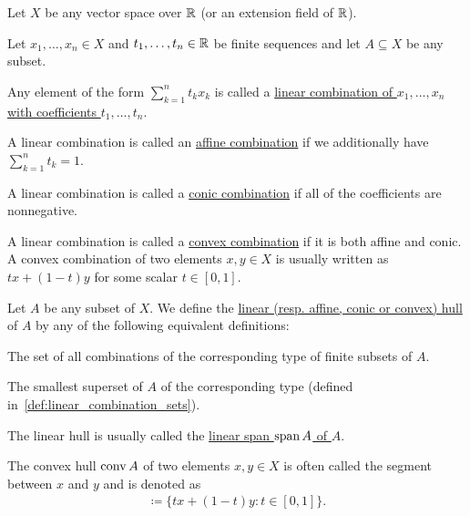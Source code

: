 Let $X$ be any vector space over $\mathbb R$ (or an extension field of $\mathbb R$).

\begin{definition}\label{def:linear_combinations}
  Let $x_1, \ldots, x_n \in X$ and $t_1, \ldots, t_n \in \mathbb R$ be finite sequences and let $A \subseteq X$ be any subset.

  \begin{defenum}
    \item Any element of the form $\sum_{k=1}^n t_k x_k$ is called a \uline{linear combination of $x_1, \ldots, x_n$ with coefficients $t_1, \ldots, t_n$}.
    \item A linear combination is called an \uline{affine combination} if we additionally have $\sum_{k=1}^n t_k = 1$.
    \item A linear combination is called a \uline{conic combination} if all of the coefficients are nonnegative.
    \item A linear combination is called a \uline{convex combination} if it is both affine and conic. A convex combination of two elements $x, y \in X$ is usually written as $tx + (1-t)y$ for some scalar $t \in [0, 1]$.
  \end{defenum}
\end{definition}

\begin{definition}\label{def:analysis:fund:hulls}
  Let $A$ be any subset of $X$. We define the \uline{linear (resp. affine, conic or convex) hull} of $A$ by any of the following equivalent definitions:
  \begin{defenum}
    \item The set of all combinations of the corresponding type of finite subsets of $A$.
    \item The smallest superset of $A$ of the corresponding type (defined in~\cref{def:linear_combination_sets}).
  \end{defenum}

  The linear hull is usually called the \uline{linear span $\operatorname{span} A$ of $A$}.

  The convex hull $\operatorname{conv} A$ of two elements $x, y \in X$ is often called the segment between $x$ and $y$ and is denoted as
  \begin{align*}
    [x, y] \coloneqq \{ tx + (1-t)y \colon t \in [0, 1] \}.
  \end{align*}
\end{definition}

